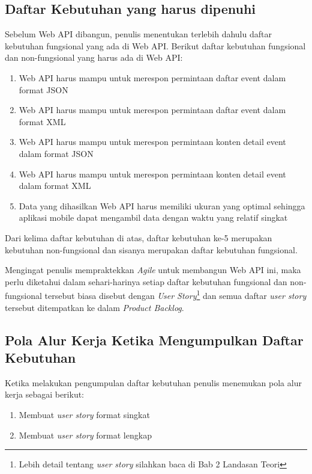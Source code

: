 \documentclass[a4paper, 12pt, oneside]{report}
\begin{document}
\subsection{Daftar Kebutuhan yang harus dipenuhi}
\onehalfspacing Sebelum Web API dibangun, penulis menentukan terlebih dahulu daftar kebutuhan fungsional yang ada di Web API. Berikut daftar kebutuhan fungsional dan non-fungsional yang harus ada di Web API:
\begin{enumerate}
    \item Web API harus mampu untuk merespon permintaan daftar event dalam format JSON
    \item Web API harus mampu untuk merespon permintaan daftar event dalam format XML
    \item Web API harus mampu untuk merespon permintaan konten detail event dalam format JSON
    \item Web API harus mampu untuk merespon permintaan konten detail event dalam format XML
    \item Data yang dihasilkan Web API harus memiliki ukuran yang optimal sehingga aplikasi mobile dapat mengambil data dengan waktu yang relatif singkat
\end{enumerate}

\onehalfspacing Dari kelima daftar kebutuhan di atas, daftar kebutuhan ke-5 merupakan kebutuhan non-fungsional dan sisanya merupakan daftar kebutuhan fungsional.

Mengingat penulis mempraktekkan \textit{Agile} untuk membangun Web API ini, maka perlu diketahui dalam sehari-harinya setiap daftar kebutuhan fungsional dan non-fungsional tersebut biasa disebut dengan \textit{User Story}\footnote{Lebih detail tentang \textit{user story} silahkan baca di Bab 2 Landasan Teori} dan semua daftar \textit{user story} tersebut ditempatkan ke dalam \textit{Product Backlog}.

\subsection{Pola Alur Kerja Ketika Mengumpulkan Daftar Kebutuhan}

\onehalfspacing Ketika melakukan pengumpulan daftar kebutuhan penulis menemukan pola alur kerja sebagai berikut:

\begin{enumerate}
  \item Membuat \textit{user story} format singkat
  \item Membuat \textit{user story} format lengkap
\end{enumerate}
\end{document}
